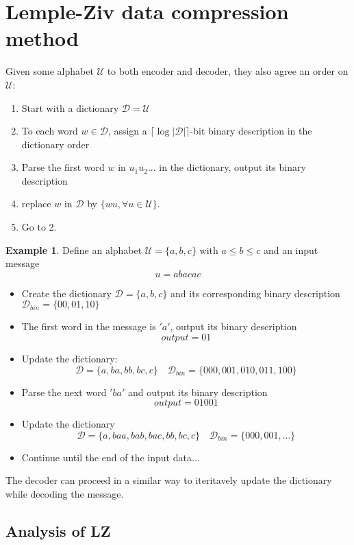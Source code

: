 \documentclass{article}
\theoremstyle{definition} %
\newtheorem{example}{Example}
\def\D{\mathcal{D}}
\def\U{\mathcal{U}}
\begin{document}

\newpage
\section{Lemple-Ziv data compression method}

Given some alphabet $\U$ to both encoder and decoder, they also agree an order on $\U$:

\begin{enumerate}
  \item Start with a dictionary $\D = \U$
  \item To each word $w \in \D$, assign a $\lceil \log |\D| \rceil $-bit binary description in the dictionary order
  \item Parse the first word $w$ in $u_1 u_2 ...$ in the dictionary, output its binary description
  \item replace $w$ in $\D$ by $\{ wu, \forall u \in \U \}$.
  \item Go to 2.
\end{enumerate}

\begin{example}
  Define an alphabet $\U = \{a, b, c\}$ with $a \leq b \leq c$ and an input message
  $$ u = a b a c a c $$
  \begin{itemize}
    \item Create the dictionary $\D = \{a, b, c\}$ and its corresponding binary description $\D_{bin} = \{00, 01, 10\}$
    \item The first word in the message is $'a'$, output its binary description
    $$ output = 01 $$
    \item Update the dictionary:
    $$ \D = \{a, ba, bb, bc , c\} \quad \D_{bin} = \{000, 001, 010, 011, 100\} $$
    \item Parse the next word $'ba'$ and output its binary description
    $$ output = 01 001 $$
    \item Update the dictionary
    $$ \D = \{a, baa, bab, bac, bb, bc , c\} \quad \D_{bin} = \{000, 001, ...\} $$
    \item Continue until the end of the input data...
  \end{itemize}
  The decoder can proceed in a similar way to iteritavely update the dictionary while decoding the message.
\end{example}

\subsection{Analysis of LZ}
\end{document}
